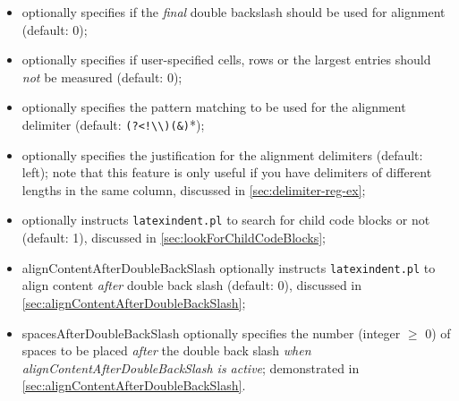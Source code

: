 \begin{itemize}
{        alignment}\texttt{justification}: optionally specifies the justification of each
        cell as either \emph{left} or \emph{right} (default: left);
  \item {}
        optionally specifies if the \emph{final} double backslash should be used for
        alignment (default: 0);
  \item {} optionally specifies if
        user-specified cells, rows or the largest entries should \emph{not} be measured
        (default: 0);
  \item {} optionally
        specifies the pattern matching to be used for the alignment delimiter (default:
        \lstinline* '(?<!\\)(&)'*);
  \item {} optionally
        specifies the justification for the alignment delimiters (default: left); note
        that this feature is only useful if you have delimiters of different lengths in
        the same column, discussed in \cref{sec:delimiter-reg-ex};
  \item {}
        optionally instructs \texttt{latexindent.pl} to search for child code blocks or
        not (default: 1), discussed in \cref{sec:lookForChildCodeBlocks};
  \item {}
        alignContentAfterDoubleBackSlash optionally instructs \texttt{latexindent.pl} to
        align content \emph{after} double back slash (default: 0), discussed in
        \cref{sec:alignContentAfterDoubleBackSlash};
  \item {}
        spacesAfterDoubleBackSlash optionally specifies the number (integer $\geq$ 0) of
        spaces to be placed \emph{after} the double back slash \emph{when
        alignContentAfterDoubleBackSlash is active}; demonstrated in
        \cref{sec:alignContentAfterDoubleBackSlash}.
 \end{itemize}

